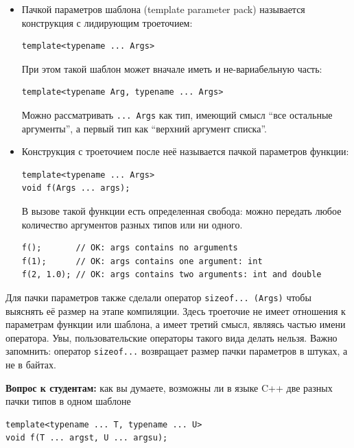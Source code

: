 \documentclass[a4paper,12pt,oneside]{article}
\begin{document}
\begin{itemize}
\item
Пачкой параметров шаблона (template parameter pack) называется конструкция с лидирующим троеточием:

\begin{lstlisting}
template<typename ... Args>
\end{lstlisting}

При этом такой шаблон может вначале иметь и не-вариабельную часть:

\begin{lstlisting}
template<typename Arg, typename ... Args>
\end{lstlisting}

Можно рассматривать \lstinline!... Args! как тип, имеющий смысл ``все остальные аргументы'', а первый тип как ``верхний аргумент списка''.

\item
Конструкция с троеточием после неё называется пачкой параметров функции:

\begin{lstlisting}
template<typename ... Args>
void f(Args ... args);
\end{lstlisting}

В вызове такой функции есть определенная свобода: можно передать любое количество аргументов разных типов или ни одного.

\begin{lstlisting}
f();       // OK: args contains no arguments
f(1);      // OK: args contains one argument: int
f(2, 1.0); // OK: args contains two arguments: int and double
\end{lstlisting}
\end{itemize}

Для пачки параметров также сделали оператор \lstinline!sizeof... (Args)! чтобы выяснять её размер на этапе компиляции. Здесь троеточие не имеет отношения к параметрам функции или шаблона, а имеет третий смысл, являясь частью имени оператора. Увы, пользовательские операторы такого вида делать нельзя. Важно запомнить: оператор \lstinline!sizeof...! возвращает размер пачки параметров в штуках, а не в байтах.

\textbf{Вопрос к студентам:} как вы думаете, возможны ли в языке C++ две разных пачки типов в одном шаблоне

\begin{lstlisting}
template<typename ... T, typename ... U>
void f(T ... argst, U ... argsu);
\end{lstlisting}
\end{document}
